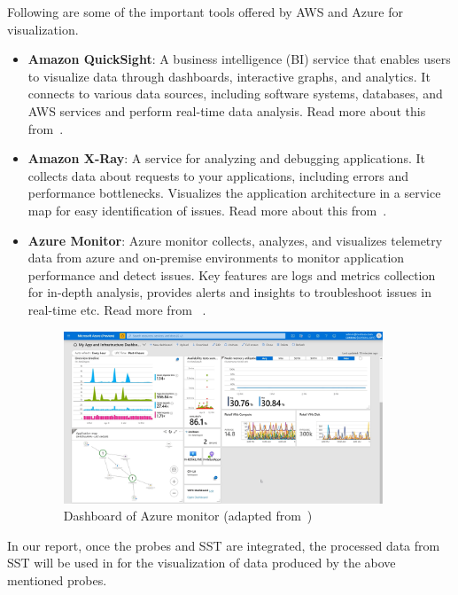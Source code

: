 Following are some of the important tools offered by AWS and Azure for visualization.
\begin{itemize}[label=$\bullet$]
	\item \textbf{Amazon QuickSight}: A business intelligence (BI) service that enables users to visualize data through dashboards, interactive graphs, and analytics. It connects to various data sources, including software systems, databases, and AWS services and perform real-time data analysis. Read more about this from~\citep{AWSQuickSight2025}. 
	\item \textbf{Amazon X-Ray}: A service for analyzing and debugging applications. It collects data about requests to your applications, including errors and performance bottlenecks. Visualizes the application architecture in a service map for easy identification of issues. Read more about this from~\citep{AWSXRay2025}.
	\item \textbf{Azure Monitor}: Azure monitor collects, analyzes, and visualizes telemetry data from azure and on-premise environments to monitor application performance and detect issues. Key features are logs and metrics collection for in-depth analysis, provides alerts and insights to troubleshoot issues in real-time etc. Read more from ~\citep{AzureMonitor2025}.
	
	\begin{figure}[H]
		\centering
		\includegraphics[width=0.9\textwidth]{figures/azure_monitor_dashboard.png}
		\caption[Azure Monitor]{Dashboard of Azure monitor (adapted from~\cite{AzureMonitorBestPractices2025})}
		\label{fig_azure_monitor}
	\end{figure}

\end{itemize}


In our report, once the probes and SST are integrated, the processed data from SST will be used in for the visualization of data produced by the above mentioned probes. 

